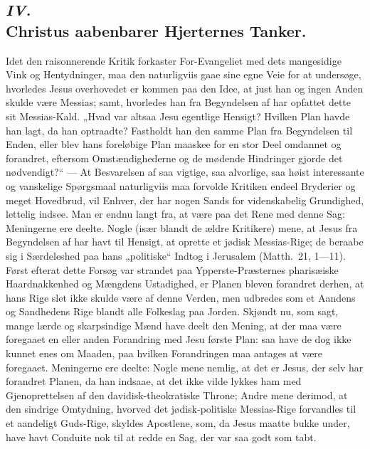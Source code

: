 \documentclass[12pt,a4paper]{book}
\begin{document}
\subsection*{\textit{IV.}\\[4pt] Christus aabenbarer Hjerternes Tanker.}

Idet den raisonnerende Kritik forkaster For-Evangeliet med dets mangesidige Vink
og Hentydninger, maa den naturligviis gaae sine egne Veie for at undersøge,
hvorledes Jesus overhovedet er kommen paa den Idee, at just han og ingen Anden
skulde være Messias; samt, hvorledes han fra Begyndelsen af har opfattet
dette sit Messias-Kald. „Hvad var altsaa Jesu egentlige Hensigt? Hvilken Plan
havde han lagt, da han optraadte? Fastholdt han den samme Plan fra Begyndelsen
til Enden, eller blev hans foreløbige Plan maaskee for en stor Deel omdannet og
forandret, eftersom Omstændighederne og de mødende Hindringer gjorde det
nødvendigt?“ --- At Besvarelsen af saa vigtige, saa alvorlige, saa høist
interessante og vanskelige Spørgsmaal naturligviis maa forvolde Kritiken endeel
Bryderier og meget Hovedbrud, vil Enhver, der har nogen Sands for videnskabelig
Grundighed, lettelig indsee. Man er endnu langt fra, at være paa det Rene med
denne Sag: Meningerne ere deelte. Nogle (især blandt de ældre Kritikere) mene, at
Jesus fra Begyndelsen af har havt til Hensigt, at oprette et jødisk
Messias-Rige; de beraabe sig i Særdeleshed paa hans „politiske“ Indtog i
Jerusalem (Matth.\ 21, 1---11). Først efterat dette Forsøg var strandet paa
Ypperste-Præsternes pharisæiske Haardnakkenhed og Mængdens Ustadighed, er Planen
bleven forandret derhen, at hans Rige slet ikke skulde være af denne Verden, men
udbredes som et Aandens og Sandhedens Rige blandt alle Folkeslag paa Jorden.
Skjøndt nu, som sagt, mange lærde og skarpsindige Mænd have deelt den Mening, at
der maa være foregaaet en eller anden Forandring med Jesu første Plan: saa have
de dog ikke kunnet enes om Maaden, paa hvilken Forandringen maa antages at være
foregaaet. Meningerne ere deelte: Nogle mene nemlig, at det er Jesus, der selv
har forandret Planen, da han indsaae, at det ikke vilde lykkes ham med
Gjenoprettelsen af den davidisk-theokratiske Throne; Andre mene derimod, at den
sindrige Omtydning, hvorved det jødisk-politiske Messias-Rige forvandles til et
aandeligt Guds-Rige, skyldes Apostlene, som, da Jesus maatte bukke under, have
havt Conduite nok til at redde en Sag, der var saa godt som tabt.
\end{document}
